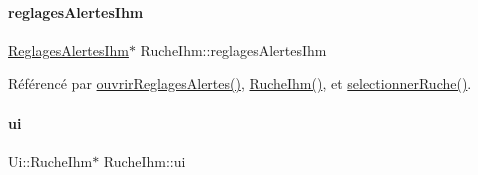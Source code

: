 \paragraph{\texorpdfstring{reglages\+Alertes\+Ihm}{reglagesAlertesIhm}}
{\footnotesize\ttfamily \hyperlink{class_reglages_alertes_ihm}{Reglages\+Alertes\+Ihm}$\ast$ Ruche\+Ihm\+::reglages\+Alertes\+Ihm\hspace{0.3cm}{\ttfamily [private]}}



Référencé par \hyperlink{class_ruche_ihm_ab8db02641e73f348fd6162321a3765da}{ouvrir\+Reglages\+Alertes()}, \hyperlink{class_ruche_ihm_a04c2544ba4e9cca6c38f553c32d63dee}{Ruche\+Ihm()}, et \hyperlink{class_ruche_ihm_a7324ae6ea574ccdad47783f466933157}{selectionner\+Ruche()}.

\mbox{\label{class_ruche_ihm_a64786058bd7f88ca2f1e9743bb27c25b}} 
\paragraph{\texorpdfstring{ui}{ui}}
{\footnotesize\ttfamily Ui\+::\+Ruche\+Ihm$\ast$ Ruche\+Ihm\+::ui\hspace{0.3cm}{\ttfamily [private]}}



